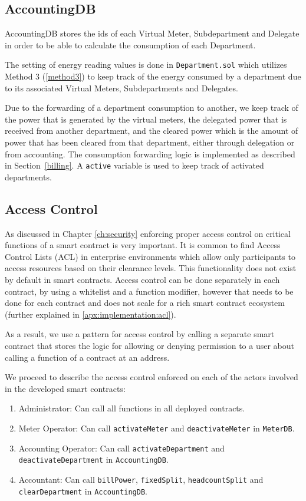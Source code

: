 

\subsection{AccountingDB}

AccountingDB stores the ids of each Virtual Meter, Subdepartment and Delegate in order to be able to calculate the consumption of each Department. 

The setting of energy reading values is done in \texttt{Department.sol} which utilizes Method 3 (\ref{method3}) to keep track of the energy consumed by a department due to its associated Virtual Meters, Subdepartments and Delegates. 

Due to the forwarding of a department consumption to another, we keep track of the power that is generated by the virtual meters, the delegated power that is received from another department, and the cleared power which is the amount of power that has been cleared from that department, either through delegation or from accounting. The consumption forwarding logic is implemented as described in Section~\ref{billing}. A \texttt{active} variable is used to keep track of activated departments.



\subsection{Access Control}
As discussed in Chapter \ref{ch:security} enforcing proper access control on critical functions of a smart contract is very important. It is common to find Access Control Lists (ACL) in enterprise environments which allow only participants to access resources based on their clearance levels. This functionality does not exist by default in smart contracts. Access control can be done separately in each contract, by using a whitelist and a function modifier, however that needs to be done for each contract and does not scale for a rich smart contract ecosystem (further explained in \ref{apx:implementation:acl}). 

As a result, we use a pattern for access control by calling a separate smart contract that stores the logic for allowing or denying permission to a user about calling a function of a contract at an address. 

We proceed to describe the access control enforced on each of the actors involved in the developed smart contracts:
\begin{enumerate}
    \item Administrator: Can call all functions in all deployed contracts.
    \item Meter Operator: Can call \texttt{activateMeter} and \texttt{deactivateMeter} in \texttt{MeterDB}.
    \item Accounting Operator: Can call \texttt{activateDepartment} and \texttt{deactivateDepartment} in \texttt{AccountingDB}.
    \item Accountant: Can call \texttt{billPower}, \texttt{fixedSplit}, \texttt{headcountSplit} and \texttt{clearDepartment} in \texttt{AccountingDB}.
\end{enumerate}

